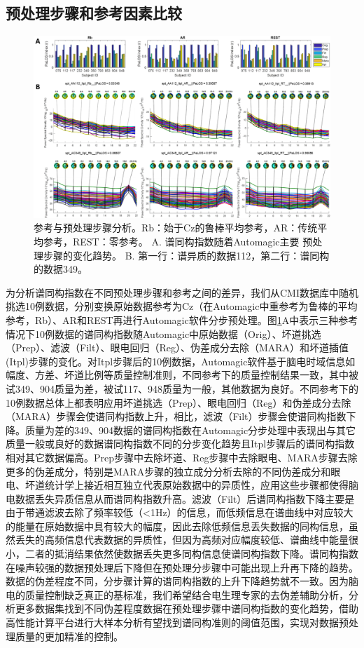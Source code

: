 \subsection{预处理步骤和参考因素比较}
\begin{figure}[!h]
	\includegraphics[width=15cm]{pic/palos/step.png}
	\caption{参考与预处理步骤分析。Rb：始于Cz的鲁棒平均参考，AR：传统平均参考，REST：零参考。 A. 谱同构指数随着Automagic主要
	预处理步骤的变化趋势。 B. 第一行：谱异质的数据112，第二行：谱同构的数据349。}
	\label{step}
\end{figure}
为分析谱同构指数在不同预处理步骤和参考之间的差异，我们从CMI数据库中随机挑选10例数据，分别变换原始数据参考为Cz（在Automagic中重参考为鲁棒的平均参考，Rb）、AR和REST再进行Automagic软件分步预处理。图\ref{step}A中表示三种参考情况下10例数据的谱同构指数随Automagic中原始数据（Orig）、坏道挑选（Prep）、滤波（Filt）、眼电回归（Reg）、伪差成分去除（MARA）和坏道插值(Itpl)步骤的变化。对Itpl步骤后的10例数据，Automagic软件基于脑电时域信息如幅度、方差、坏道比例等质量控制准则，不同参考下的质量控制结果一致，其中被试349、904质量为差，被试117、948质量为一般，其他数据为良好。不同参考下的10例数据总体上都表明应用坏道挑选（Prep）、眼电回归（Reg）和伪差成分去除（MARA）步骤会使谱同构指数上升，相比，滤波（Filt）步骤会使谱同构指数下降。质量为差的349、904数据的谱同构指数在Automagic分步处理中表现出与其它质量一般或良好的数据谱同构指数不同的分步变化趋势且Itpl步骤后的谱同构指数相对其它数据偏高。Prep步骤中去除坏道、Reg步骤中去除眼电、MARA步骤去除更多的伪差成分，特别是MARA步骤的独立成分分析去除的不同伪差成分和眼电、坏道统计学上接近相互独立代表原始数据中的异质性，应用这些步骤都使得脑电数据丢失异质信息从而谱同构指数升高。滤波（Filt）后谱同构指数下降主要是由于带通滤波去除了频率较低（<1Hz）的信息，而低频信息在谱曲线中对应较大的能量在原始数据中具有较大的幅度，因此去除低频信息丢失数据的同构信息，虽然丢失的高频信息代表数据的异质性，但因为高频对应幅度较低、谱曲线中能量很小，二者的抵消结果依然使数据丢失更多同构信息使谱同构指数下降。谱同构指数在噪声较强的数据预处理后下降但在预处理分步骤中可能出现上升再下降的趋势。数据的伪差程度不同，分步骤计算的谱同构指数的上升下降趋势就不一致。因为脑电的质量控制缺乏真正的基标准，我们希望结合电生理专家的去伪差辅助分析，分析更多数据集找到不同伪差程度数据在预处理步骤中谱同构指数的变化趋势，借助高性能计算平台进行大样本分析有望找到谱同构准则的阈值范围，实现对数据预处理质量的更加精准的控制。

